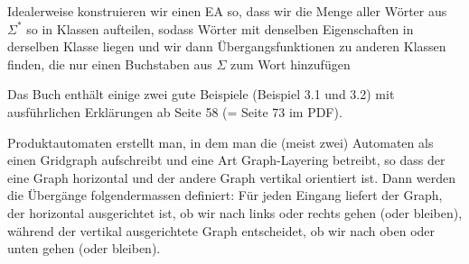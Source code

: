 Idealerweise konstruieren wir einen EA so, dass wir die Menge aller Wörter aus $\Sigma^*$ so in Klassen aufteilen,
sodass Wörter mit denselben Eigenschaften in derselben Klasse liegen und wir dann Übergangsfunktionen zu anderen Klassen finden,
die nur einen Buchstaben aus $\Sigma$ zum Wort hinzufügen

\inlineex Das Buch enthält einige zwei gute Beispiele (Beispiel 3.1 und 3.2) mit ausführlichen Erklärungen ab Seite 58 (= Seite 73 im PDF).

Produktautomaten erstellt man, in dem man die (meist zwei) Automaten als einen Gridgraph aufschreibt und eine Art Graph-Layering betreibt,
so dass der eine Graph horizontal und der andere Graph vertikal orientiert ist.
Dann werden die Übergänge folgendermassen definiert: 
Für jeden Eingang liefert der Graph, der horizontal ausgerichtet ist, ob wir nach links oder rechts gehen (oder bleiben),
während der vertikal ausgerichtete Graph entscheidet, ob wir nach oben oder unten gehen (oder bleiben).
